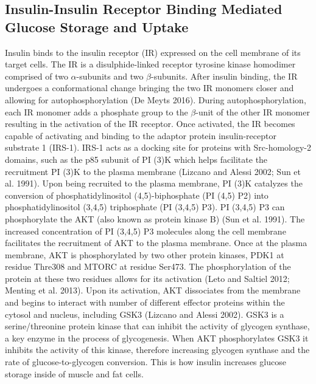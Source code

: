 \documentclass{article}
\begin{document}
\subsection{Insulin-Insulin Receptor Binding Mediated Glucose Storage and Uptake}
Insulin binds to the insulin receptor (IR) expressed on the cell membrane of its target cells. The IR is a disulphide-linked
receptor tyrosine kinase homodimer comprised of two $\alpha$-subunits and two $\beta$-subunits. After insulin binding, the IR undergoes a conformational change bringing the two IR monomers closer and allowing for autophosphorylation (De Meyts 2016). During
autophosphorylation, each IR monomer adds a phosphate group to the $\beta$-unit of the other IR monomer resulting in the activation
of the IR receptor. Once activated, the IR becomes capable of activating and binding to the adaptor protein insulin-receptor
substrate 1 (IRS-1). IRS-1 acts as a docking site for proteins with Src-homology-2 domains, such as the p85 subunit of PI
(3)K which helps facilitate the recruitment PI (3)K to the plasma membrane (Lizcano and Alessi 2002; Sun et al. 1991). Upon
being recruited to the plasma membrane, PI (3)K catalyzes the conversion of phosphatidylinositol (4,5)-biphosphate (PI (4,5)
P2) into phosphatidylinositol (3,4,5) triphosphate (PI (3,4,5) P3). PI (3,4,5) P3 can phosphorylate the AKT (also known as
protein kinase B) (Sun et al. 1991). The increased concentration of PI (3,4,5) P3 molecules along the cell membrane facilitates
the recruitment of AKT to the plasma membrane. Once at the plasma membrane, AKT is phosphorylated by two other protein
kinases, PDK1 at residue Thre308 and MTORC at residue Ser473. The phosphorylation of the protein at these two residues
allows for its activation (Leto and Saltiel 2012; Menting et al. 2013). Upon its activation, AKT dissociates from the membrane
and begins to interact with number of different effector proteins within the cytosol and nucleus, including GSK3 (Lizcano and
Alessi 2002). GSK3 is a serine/threonine protein kinase that can inhibit the activity of glycogen synthase, a key enzyme in the
process of glycogenesis. When AKT phosphorylates GSK3 it inhibits the activity of this kinase, therefore increasing glycogen
synthase and the rate of glucose-to-glycogen conversion. This is how insulin increases glucose storage inside of muscle and fat
cells.
\end{document}

